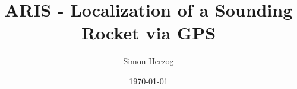 \documentclass[    
    paper=a4,
    twoside=false,
    12pt,
    pagesize=auto,
    parskip=half,
    headsepline=true,
    numbers=noenddot, %
    draft=false
]{report}
\title{ARIS - Localization of a Sounding Rocket via GPS}
\author{Simon Herzog}
\date{\today}
\begin{document}
 
 \setcounter{page}{1}
 
  

 
 
 
 
 \tableofcontents
 
 \newpage
 
 \setcounter{page}{1}

 

 
 
 
 
 
 
 
 
 
 
 
 
 
 
 \begin{appendices}
  
  
  
 \end{appendices}
 
\end{document}
